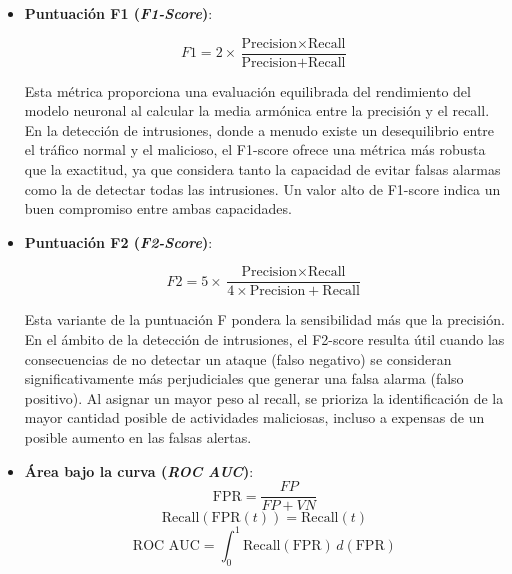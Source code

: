 \begin{itemize}
\item \textbf{Puntuación F1 (\textit{F1-Score})}: \label{met:F1-score}

\begin{equation}
    F1 = 2 \times \frac{\text{Precision} \times \text{Recall}}{\text{Precision} + \text{Recall}}
\end{equation}

Esta métrica proporciona una evaluación equilibrada del rendimiento del modelo neuronal al calcular la media armónica entre la precisión y el recall. En la detección de intrusiones, donde a menudo existe un desequilibrio entre el tráfico normal y el malicioso, el F1-score ofrece una métrica más robusta que la exactitud, ya que considera tanto la capacidad de evitar falsas alarmas como la de detectar todas las intrusiones. Un valor alto de F1-score indica un buen compromiso entre ambas capacidades.

\item \textbf{Puntuación F2 (\textit{F2-Score})}: \label{met:F2-score}

\begin{equation}
    F2 = 5 \times \frac{\text{Precision} \times \text{Recall}}{4 \times \text{Precision} + \text{Recall}}
\end{equation}

Esta variante de la puntuación F pondera la sensibilidad más que la precisión. En el ámbito de la detección de intrusiones, el F2-score resulta útil cuando las consecuencias de no detectar un ataque (falso negativo) se consideran significativamente más perjudiciales que generar una falsa alarma (falso positivo). Al asignar un mayor peso al recall, se prioriza la identificación de la mayor cantidad posible de actividades maliciosas, incluso a expensas de un posible aumento en las falsas alertas.


\item \textbf{Área bajo la curva (\textit{ROC AUC})}: \label{met:ROCAUC}
\begin{equation}
    \text{FPR} = \frac{FP}{FP + VN}
\end{equation}
\begin{equation}
    \text{Recall}(\text{FPR}(t)) = \text{Recall}(t)
\end{equation}
\begin{equation}
    \text{ROC AUC} = \int_{0}^{1} \text{Recall}(\text{FPR}) \, d(\text{FPR})
\end{equation}




\end{itemize}
